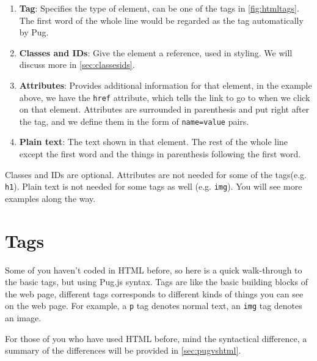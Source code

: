 \begin{enumerate}
    \item \textbf{Tag}: Specifies the type of element, can be one of the tags in \cref{fig:htmltags}. The first word of the whole line would be regarded as the tag automatically by Pug.
    \item \textbf{Classes and IDs}: Give the element a reference, used in styling. We will discuss more in \cref{sec:classesids}.
    \item \textbf{Attributes}: Provides additional information for that element, in the example above, we have the \texttt{href} attribute, which tells the link to go to when we click on that element. Attributes are surrounded in parenthesis and put right after the tag, and we define them in the form of \texttt{name=value} pairs.
    \item \textbf{Plain text}: The text shown in that element. The rest of the whole line except the first word and the things in parenthesis following the first word.
\end{enumerate}

Classes and IDs are optional. Attributes are not needed for some of the tags(e.g. \texttt{h1}). Plain text is not needed for some tags as well (e.g. \texttt{img}). You will see more examples along the way.

\section{Tags}

Some of you haven't coded in HTML before, so here is a quick walk-through to the basic tags, but using Pug.js syntax. Tags are like the basic building blocks of the web page, different tags corresponds to different kinds of things you can see on the web page. For example, a \texttt{p} tag denotes normal text, an \texttt{img} tag denotes an image. 
\vspace{6mm}

For those of you who have used HTML before, mind the syntactical difference, a summary of the differences will be provided in \cref{sec:pugvshtml}. 

\pagebreak

